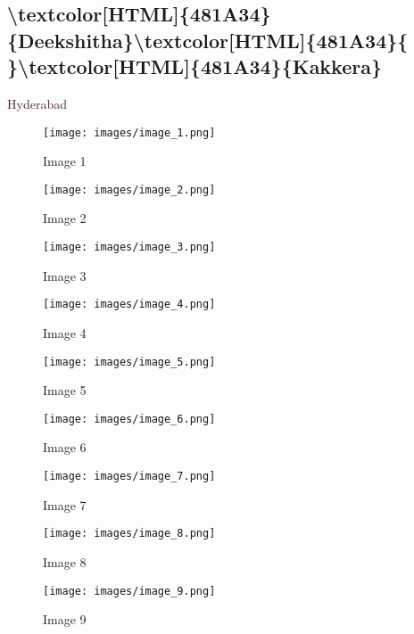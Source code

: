\documentclass[12pt]{article}%
\begin{document}
\subsection{\textbackslash{}textcolor{[}HTML{]}\{481A34\}\{Deekshitha\}\textbackslash{}textcolor{[}HTML{]}\{481A34\}\{ \}\textbackslash{}textcolor{[}HTML{]}\{481A34\}\{Kakkera\}}%
\label{subsec:subsec63}%

%
\begin{flushright}%
\textcolor[HTML]{481A34}{Hyderabad}%
\end{flushright}%
\newline%
%


\begin{figure}[h!]%
\centering%
\texttt{[image: images/image\_1.png]}%
\caption{Image 1}%
\end{figure}

%


\begin{figure}[h!]%
\centering%
\texttt{[image: images/image\_2.png]}%
\caption{Image 2}%
\end{figure}

%


\begin{figure}[h!]%
\centering%
\texttt{[image: images/image\_3.png]}%
\caption{Image 3}%
\end{figure}

%


\begin{figure}[h!]%
\centering%
\texttt{[image: images/image\_4.png]}%
\caption{Image 4}%
\end{figure}

%


\begin{figure}[h!]%
\centering%
\texttt{[image: images/image\_5.png]}%
\caption{Image 5}%
\end{figure}

%


\begin{figure}[h!]%
\centering%
\texttt{[image: images/image\_6.png]}%
\caption{Image 6}%
\end{figure}

%


\begin{figure}[h!]%
\centering%
\texttt{[image: images/image\_7.png]}%
\caption{Image 7}%
\end{figure}

%


\begin{figure}[h!]%
\centering%
\texttt{[image: images/image\_8.png]}%
\caption{Image 8}%
\end{figure}

%


\begin{figure}[h!]%
\centering%
\texttt{[image: images/image\_9.png]}%
\caption{Image 9}%
\end{figure}

%
\end{document}
